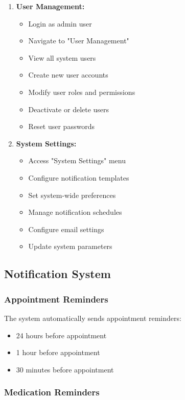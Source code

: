 \documentclass[12pt,a4paper]{article}
\begin{document}
\begin{enumerate}
    \item \textbf{User Management:}
    \begin{itemize}
        \item Login as admin user
        \item Navigate to "User Management"
        \item View all system users
        \item Create new user accounts
        \item Modify user roles and permissions
        \item Deactivate or delete users
        \item Reset user passwords
    \end{itemize}
    
    \item \textbf{System Settings:}
    \begin{itemize}
        \item Access "System Settings" menu
        \item Configure notification templates
        \item Set system-wide preferences
        \item Manage notification schedules
        \item Configure email settings
        \item Update system parameters
    \end{itemize}
\end{enumerate}

\subsection{Notification System}

\subsubsection{Appointment Reminders}

The system automatically sends appointment reminders:
\begin{itemize}
    \item 24 hours before appointment
    \item 1 hour before appointment
    \item 30 minutes before appointment
\end{itemize}

\subsubsection{Medication Reminders}
\end{document}
